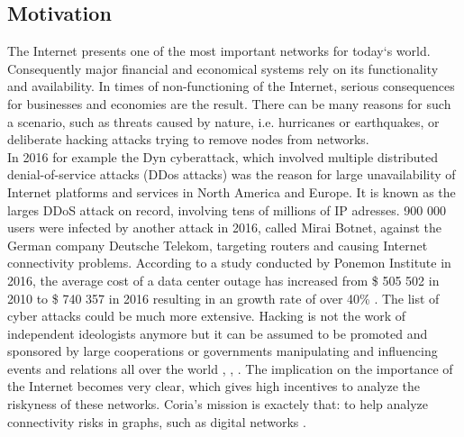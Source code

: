 \documentclass[conference, 11pt]{IEEEtran}
\begin{document}
\subsection{Motivation}
The Internet presents one of the most important networks for today‘s world. Consequently major financial and economical systems rely on its functionality and availability. In times of non-functioning of the Internet, serious consequences for businesses and economies are the result. There can be many reasons for such a scenario, such as threats caused by nature, i.e. hurricanes or earthquakes, or deliberate hacking attacks trying to remove nodes from networks.\\ \linebreak
In 2016 for example the Dyn cyberattack, which involved multiple distributed denial-of-service attacks (DDos attacks) was the reason for large unavailability of Internet platforms and services in North America and Europe. It is known as the larges DDoS attack on record, involving tens of millions of IP adresses\cite{dyn}. 900 000 users were infected by another attack in 2016, called Mirai Botnet, against the German company Deutsche Telekom, targeting routers and causing Internet connectivity problems\cite{DT}. According to a study conducted by Ponemon Institute in 2016, the average cost of a data center outage has increased from \$ 505 502 in 2010 to \$ 740 357 in 2016 resulting in an growth rate of over 40\% \cite{Ponemon}. The list of cyber attacks could be much more extensive. Hacking is not the work of independent ideologists anymore but it can be assumed to be promoted and sponsored by large cooperations or governments manipulating and influencing events and relations all over the world \cite{cyberSponsors}, \cite{cyberSponsors2}, \cite{cyberSponsors3}. The implication on the importance of the Internet becomes very clear, which gives high incentives to analyze the riskyness of these networks. Coria's mission is exactely that: to help analyze connectivity risks in graphs, such as digital networks\cite{Coria} . \linebreak
\end{document}
